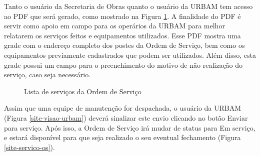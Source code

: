 \documentclass[
	article,			%
	11pt,				%
	oneside,			%
	a4paper,			%
	english,			%
	brazil,				%
	sumario=tradicional
	]{abntex2}
\begin{document}
\clearpage

Tanto o usuário da Secretaria de Obras quanto o usuário da URBAM tem acesso ao PDF que será gerado, como mostrado na Figura \ref{site-pdf}.
A finalidade do PDF é servir como apoio em campo para os operários da URBAM para melhor relatarem os serviços feitos e equipamentos utilizados.
Esse PDF mostra uma grade com o endereço completo dos postes da Ordem de Serviço, bem como os equipamentos previamente cadastrados que podem ser utilizados.
Além disso, esta grade possui um campo para o preenchimento do motivo de não realização do serviço, caso seja necessário.

\begin{figure}[!htbp]
 \centering
 \caption{\label{site-pdf}Lista de serviços da Ordem de Serviço}
\end{figure}

\clearpage

Assim que uma equipe de manutenção for despachada, o usuário da URBAM (Figura \ref{site-visao-urbam}) deverá sinalizar este envio clicando no botão Enviar para serviço.
Após isso, a Ordem de Serviço irá mudar de status para Em serviço, e estará disponível para que seja realizado o seu eventual fechamento (Figura \ref{site-servico-os}).
\end{document}

